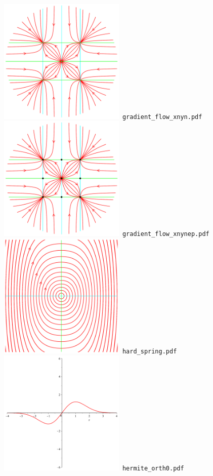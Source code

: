 \documentclass[a4paper]{amsart}
\begin{document}
\includegraphics[width=6cm]{gradient_flow_xnyn.pdf}\verb+ gradient_flow_xnyn.pdf+\\
\includegraphics[width=6cm]{gradient_flow_xnynep.pdf}\verb+ gradient_flow_xnynep.pdf+\\
\includegraphics[width=6cm]{hard_spring.pdf}\verb+ hard_spring.pdf+\\
\includegraphics[width=6cm]{hermite_orth0.pdf}\verb+ hermite_orth0.pdf+\\
\end{document}
